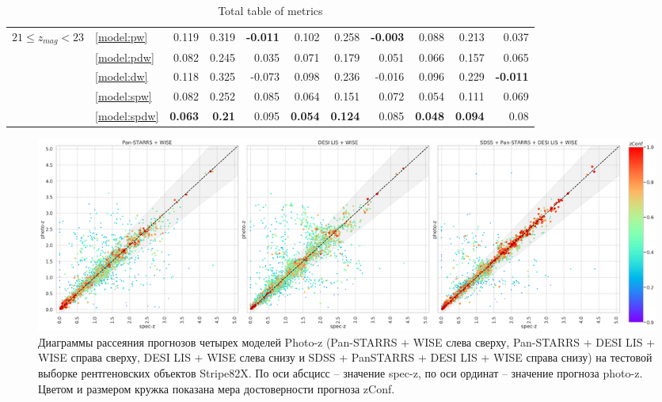 \documentclass[fleqn,usenatbib]{mnras}
\begin{document}
\begin{table}
\begin{tabular}{llrrrrrrrrr}
\hline
            $21 \leq z_{mag} < 23$ & \ref{model:pw} &                0.119 &           0.319 &  \textbf{-0.011} &            0.102 &           0.258 &  \textbf{-0.003} &            0.088 &           0.213 &            0.037 \\
                                   & \ref{model:pdw} &                0.082 &           0.245 &            0.035 &            0.071 &           0.179 &            0.051 &            0.066 &           0.157 &            0.065 \\
                                   & \ref{model:dw} &                0.118 &           0.325 &           -0.073 &            0.098 &           0.236 &           -0.016 &            0.096 &           0.229 &  \textbf{-0.011} \\
                                   & \ref{model:spw} &                0.082 &           0.252 &            0.085 &            0.064 &           0.151 &            0.072 &            0.054 &           0.111 &            0.069 \\
                                   & \ref{model:spdw} &       \textbf{0.063} &   \textbf{0.21} &            0.095 &   \textbf{0.054} &  \textbf{0.124} &            0.085 &   \textbf{0.048} &  \textbf{0.094} &             0.08 \\
\hline
            \hline
            \end{tabular}
            \caption{Total table of metrics}
\end{table}



\begin{figure}
    \centering
    \includegraphics[width=0.9\linewidth]{images/scatterplots-stripe82x.png}
    \caption{Диаграммы рассеяния прогнозов четырех моделей Photo-z (Pan-STARRS + WISE слева сверху, Pan-STARRS + DESI LIS + WISE справа сверху, DESI LIS + WISE слева снизу и SDSS + PanSTARRS + DESI LIS + WISE справа снизу) на тестовой выборке рентгеновских объектов Stripe82X. По оси абсцисс -- значение spec-z, по оси ординат -- значение прогноза photo-z. Цветом и размером кружка показана мера достоверности прогноза zConf.}
    \label{fig:s82x}
\end{figure}
\end{document}
